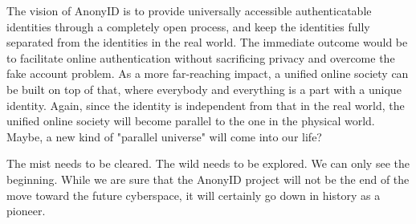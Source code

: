 \documentclass[12pt, a4paper]{article}
\begin{document}
The vision of AnonyID is to provide universally accessible authenticatable identities through a completely open process, and keep the identities fully separated from the identities in the real world. The immediate outcome would be to facilitate online authentication without sacrificing privacy and overcome the fake account problem. As a more far-reaching impact, a unified online society can be built on top of that, where everybody and everything is a part with a unique identity. Again, since the identity is independent from that in the real world, the unified online society will become parallel to the one in the physical world. Maybe, a new kind of "parallel universe" will come into our life?

The mist needs to be cleared. The wild needs to be explored. We can only see the beginning. While we are sure that the AnonyID project will not be the end of the move toward the future cyberspace, it will certainly go down in history as a pioneer. 
\end{document}
